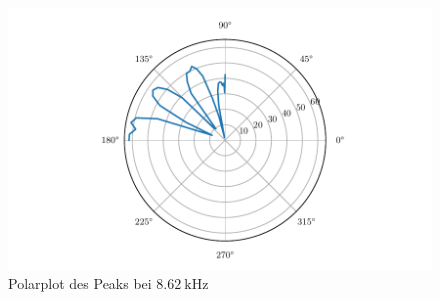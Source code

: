 \begin{figure}
    \centering
    \includegraphics{build/hvarangle86.pdf}
    \caption{Polarplot des Peaks bei $\qty{8.62}{\kilo\hertz}$}
    \label{pic:hvarangle86}
\end{figure}
